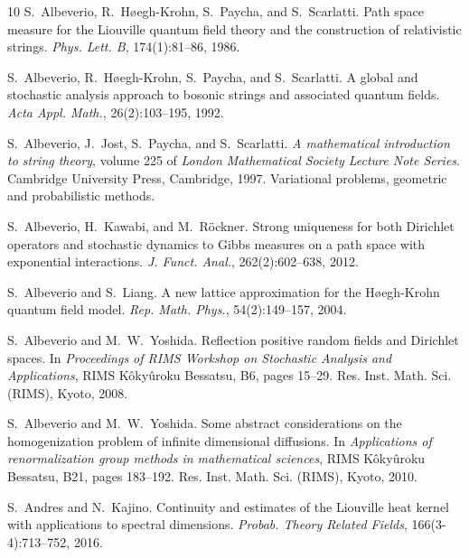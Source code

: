 \documentclass[a4paper,10pt]{article}
\newcommand{\tmtextit}[1]{{\itshape{#1}}}
\begin{document}
\begin{thebibliography}{10}
  S.~Albeverio, R.~H{\o}egh-Krohn, S.~Paycha, and 
  S.~Scarlatti. {\newblock}Path space measure for the Liouville quantum field
  theory and the construction of relativistic strings.
  {\newblock}\tmtextit{Phys. Lett. B}, 174(1):81--86, 1986.{\newblock}
  
  S.~Albeverio, R.~H{\o}egh-Krohn, S.~Paycha, and 
  S.~Scarlatti. {\newblock}A global and stochastic analysis approach to
  bosonic strings and associated quantum fields. {\newblock}\tmtextit{Acta
  Appl. Math.}, 26(2):103--195, 1992.{\newblock}
  
  S.~Albeverio, J.~Jost, S.~Paycha, and  S.~Scarlatti.
  {\newblock}\tmtextit{A mathematical introduction to string theory},  volume 
  225  of \tmtextit{London Mathematical Society Lecture Note Series}.
  {\newblock}Cambridge University Press, Cambridge, 1997.
  {\newblock}Variational problems, geometric and probabilistic
  methods.{\newblock}
  
  S.~Albeverio, H.~Kawabi, and  M.~R{\"o}ckner.
  {\newblock}Strong uniqueness for both Dirichlet operators and stochastic
  dynamics to Gibbs measures on a path space with exponential interactions.
  {\newblock}\tmtextit{J. Funct. Anal.}, 262(2):602--638, 2012.{\newblock}
  
  S.~Albeverio  and  S.~Liang. {\newblock}A new lattice
  approximation for the H{\o}egh-Krohn quantum field model.
  {\newblock}\tmtextit{Rep. Math. Phys.}, 54(2):149--157, 2004.{\newblock}
  
  S.~Albeverio  and  M.~W.~Yoshida.
  {\newblock}Reflection positive random fields and Dirichlet spaces.
  {\newblock}In \tmtextit{Proceedings of RIMS Workshop on Stochastic Analysis
  and Applications}, RIMS K{\^o}ky{\^u}roku Bessatsu, B6,  pages  15--29. Res.
  Inst. Math. Sci. (RIMS), Kyoto, 2008.{\newblock}
  
  S.~Albeverio  and  M.~W.~Yoshida. {\newblock}Some
  abstract considerations on the homogenization problem of infinite
  dimensional diffusions. {\newblock}In \tmtextit{Applications of
  renormalization group methods in mathematical sciences}, RIMS
  K{\^o}ky{\^u}roku Bessatsu, B21,  pages  183--192. Res. Inst. Math. Sci.
  (RIMS), Kyoto, 2010.{\newblock}
  
  S.~Andres  and  N.~Kajino. {\newblock}Continuity and
  estimates of the Liouville heat kernel with applications to spectral
  dimensions. {\newblock}\tmtextit{Probab. Theory Related Fields},
  166(3-4):713--752, 2016.{\newblock}
  

\end{thebibliography}
\end{document}
